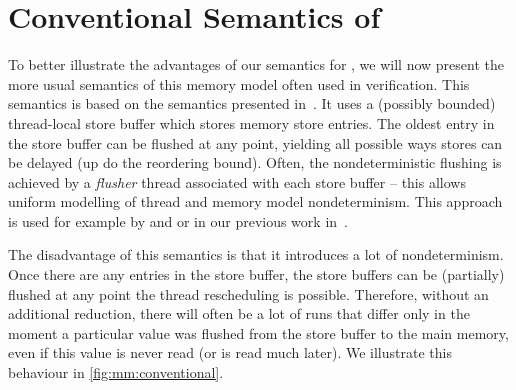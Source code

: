 
\section{Conventional Semantics of \xtso}

To better illustrate the advantages of our semantics for \xtso, we
will now present the more usual semantics of this memory model often used in
verification.
This semantics is based on the \xtso semantics presented in~.
It uses a (possibly bounded) thread-local store buffer which stores memory store entries.
The oldest entry in the store buffer can be flushed at any point, yielding all
possible ways stores can be delayed (up do the reordering bound).
Often, the nondeterministic flushing is achieved by a \emph{flusher} thread
associated with each store buffer -- this allows uniform modelling of thread
and memory model nondeterminism.
This approach is used for example by  and 
or in our previous work in~.

The disadvantage of this semantics is that it introduces a lot of
nondeterminism.
Once there are any entries in the store buffer, the store buffers can be
(partially) flushed at any point the thread rescheduling is possible.
Therefore, without an additional reduction, there will often be a lot of runs
that differ only in the moment a particular value was flushed from the store
buffer to the main memory, even if this value is never read (or is read much
later).
We illustrate this behaviour in \autoref{fig:mm:conventional}.

